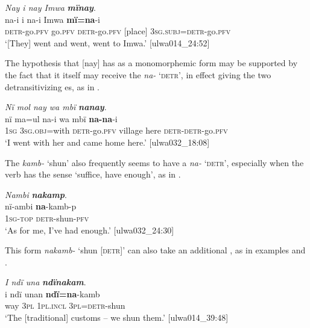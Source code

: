 \ea%
    \label{ex:syntax:336}
          \textit{Nay i nay Imwa} \textbf{\textit{mïnay}}.\\
\gll na-i      i    na-i      Imwa  \textbf{mï=na}{}-i\\
    \textsc{detr-}go.\textsc{pfv}  go.\textsc{pfv}  \textsc{detr-}go.\textsc{pfv}  [place]  3\textsc{sg.subj}=\textsc{detr}{}-go.\textsc{pfv}\\
\glt `[They] went and went, went to Imwa.’ [ulwa014\_24:52]
\z

The hypothesis that [nay] has  as a monomorphemic form may be supported by the fact that it itself may receive the  \textit{na-} \textsc{‘detr’}, in effect giving the  two detransitivizing es, as in .

\ea%
    \label{ex:syntax:337}
          \textit{Nï mol nay wa mbï} \textbf{\textit{nanay}}.\\
\gll nï    ma=ul      na-i      wa  mbï     \textbf{na-na}{}-i\\
    1\textsc{sg}  \textsc{3sg.obj}=with  \textsc{detr-}go.\textsc{pfv}  village  here    \textsc{detr-detr-}go\textsc{.pfv}\\
\glt `I went with her and came home here.’ [ulwa032\_18:08]
\z

The  \textit{kamb-} ‘shun’ also frequently seems to have a   \textit{na-} \textsc{‘detr’}, especially when the verb has the sense ‘suffice, have enough’, as in .

\ea%
    \label{ex:syntax:338}
          \textit{Nambi} \textbf{\textit{nakamp}}.\\
\gll nï-ambi  \textbf{na}{}-kamb-p\\
    1\textsc{sg-top}  \textsc{detr-}shun-\textsc{pfv}\\
\glt `As for me, I’ve had enough.’ [ulwa032\_24:30]
\z

This form \textit{nakamb-} ‘shun [\textsc{detr]}’ can also take an additional , as in examples  and .


\ea%
    \label{ex:syntax:339}
          \textit{I ndï una} \textbf{\textit{ndïnakam}}.\\
\gll i    ndï  unan    \textbf{ndï=na}{}-kamb\\
    way  3\textsc{pl}  \textsc{1pl.incl}  \textsc{3pl=detr-}shun\\
\glt `The [traditional] customs – we shun them.’ [ulwa014\_39:48]
\z

